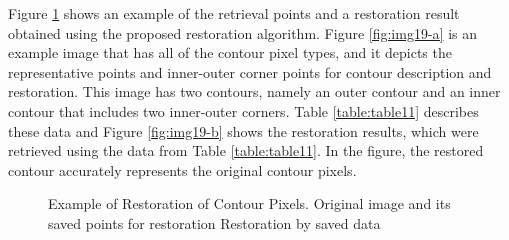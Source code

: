 
Figure \ref{fig:image19} shows an example of the retrieval points and a restoration result obtained using the proposed restoration algorithm. Figure \ref{fig:img19-a} is an example image that has all of the contour pixel types, and it depicts the representative points and inner-outer corner points for contour description and restoration. This image has two contours, namely an outer contour and an inner contour that includes two inner-outer corners. Table \ref{table:table11} describes these data and Figure \ref{fig:img19-b} shows the restoration results, which were retrieved using the data from Table \ref{table:table11}. In the figure, the restored contour accurately represents the original contour pixels.

\begin{figure}[htbp]
	\centering
	 
	\caption{Example of Restoration of Contour Pixels. \protect{} Original image and its saved points for restoration      \protect{} Restoration by saved data}
	\label{fig:image19}
\end{figure}

